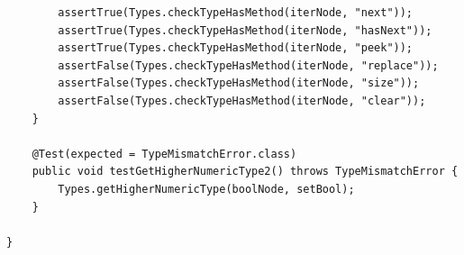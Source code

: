 \documentclass{report}
\begin{document}
\begin{verbatim}
		assertTrue(Types.checkTypeHasMethod(iterNode, "next"));
		assertTrue(Types.checkTypeHasMethod(iterNode, "hasNext"));
		assertTrue(Types.checkTypeHasMethod(iterNode, "peek"));
		assertFalse(Types.checkTypeHasMethod(iterNode, "replace"));
		assertFalse(Types.checkTypeHasMethod(iterNode, "size"));
		assertFalse(Types.checkTypeHasMethod(iterNode, "clear"));
	}
	
	@Test(expected = TypeMismatchError.class)
	public void testGetHigherNumericType2() throws TypeMismatchError {
		Types.getHigherNumericType(boolNode, setBool);
	}

}

\end{verbatim}

\nocite{*}


\end{document}
